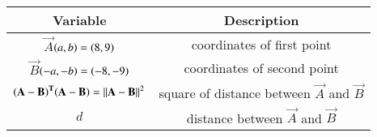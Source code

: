 \begin{tabular}[12pt]{ |c| c|}
    \hline
	\textbf{Variable}  & \textbf{Description} \\
    \hline
	$\vec{A}$$\left(a,b\right)=\left(8,9\right)$ &  coordinates of first point\\
    \hline 
	$\vec{B}$$\left(-a,-b\right)=\left(-8,-9\right)$ & coordinates of second point\\
    \hline
	$\mathbf{\left(A-B\right)^T}\mathbf{\left(A-B\right)}=\left\lVert\mathbf A-\mathbf B \right\rVert^2$ &square of distance between $\vec A$ and $\vec B$\\  
    \hline
	$d$ & distance between $\vec A$ and $\vec B$\\
    \hline 	
         
\end{tabular}
